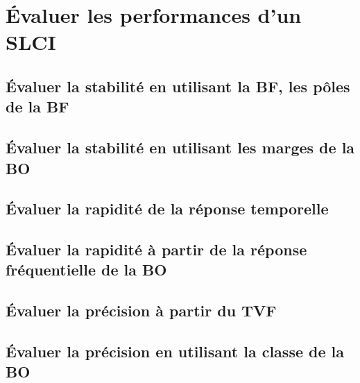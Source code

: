 \setchapterpreamble[u]{\margintoc} 
\chapter{Évaluer les performances d'un SLCI} 
\section{Évaluer la stabilité en utilisant la BF, les pôles de la BF} 
\section{Évaluer la stabilité en utilisant les marges de la BO} 
\graphicspath{{\repStyle/png/}{../PERF/PERF-02-Marges/61_Hemostase/images/}} 
 
 
\graphicspath{{\repStyle/png/}{../PERF/PERF-02-Marges/62_Palettisation/images/}} 
 
 
\graphicspath{{\repStyle/png/}{../PERF/PERF-02-Marges/63_BancHydraulique/images/}} 
 
 
\graphicspath{{\repStyle/png/}{../PERF/PERF-02-Marges/64_EPAS/images/}} 
 
 
\section{Évaluer la rapidité de la réponse temporelle} 
\section{Évaluer la rapidité à partir de la réponse fréquentielle de la BO} 
\section{Évaluer la précision à partir du TVF} 
\graphicspath{{\repStyle/png/}{../PERF/PERF-05-Precistion-TVF/501_Divers/images/}} 
 
 
\graphicspath{{\repStyle/png/}{../PERF/PERF-05-Precistion-TVF/509_Divers/images/}} 
 
 
\section{Évaluer la précision en utilisant la classe de la BO} 
\graphicspath{{\repStyle/png/}{../PERF/PERF-06-Precision/63_BancHydraulique/images/}} 
 
 
\graphicspath{{\repStyle/png/}{../PERF/PERF-06-Precision/64_EPAS/images/}} 
 
 
\graphicspath{{\repStyle/png/}{../PERF/PERF-06-Precision/73_Bassin/images/}} 
 
 
